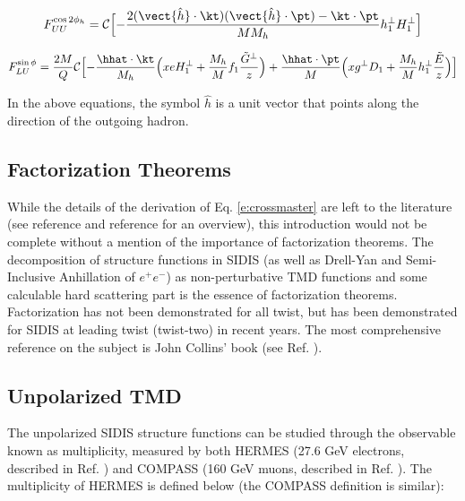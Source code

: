 \begin{equation}
F_{UU}^{\cos 2\phi_h} = \mathcal{C} \Bigl[ - \frac{2 (\vect{\hat{h}} \cdot \kt) (\vect{\hat{h}} \cdot \pt) - \kt \cdot \pt}{M M_h} h_{1}^{\perp} H_{1}^{\perp} \Bigr]
\end{equation}

\begin{equation}
  F_{LU}^{\sin\phi} = \frac{2M}{Q} \mathcal{C} \Bigl[ -\frac{\hhat \cdot \kt}{M_h} \Bigl( xeH_1^\perp + \frac{M_h}{M} f_1 \frac{\tilde{G}^\perp}{z} \Bigr) + 
    \frac{\hhat \cdot \pt}{M} \Bigl( xg^\perp D_1 + \frac{M_h}{M} h_{1}^{\perp} \frac{\tilde{E}}{z} \Bigr) \Bigr]
\end{equation}

In the above equations, the symbol $\hat{h}$ is a unit vector that points along the direction of the outgoing hadron. 

\subsection{Factorization Theorems}
While the details of the derivation of Eq. \ref{e:crossmaster} are left to the literature (see reference \cite{tmds-mulders:1995} and reference \cite{tmds-bacchetta:2006} for an overview), this introduction would not be complete without a mention of the importance of factorization theorems.  The decomposition of structure functions in SIDIS (as well as Drell-Yan and Semi-Inclusive Anhillation of $e^+e^-$) as non-perturbative TMD functions and some calculable hard scattering part is the essence of factorization theorems.  Factorization has not been demonstrated for all twist, but has been demonstrated for SIDIS at leading twist (twist-two) in recent years.  The most comprehensive reference on the subject is John Collins' book (see Ref. \cite{tmds-collins:2011}). 

\subsection{Unpolarized TMD}
The unpolarized SIDIS structure functions can be studied through the observable known as multiplicity, measured by both HERMES (27.6 GeV electrons, described in Ref. \cite{tmds-airapetian:2012}) and COMPASS (160 GeV muons, described in Ref. \cite{tmds-aghasyan:2017}).  The multiplicity of HERMES is defined below (the COMPASS definition is similar):

